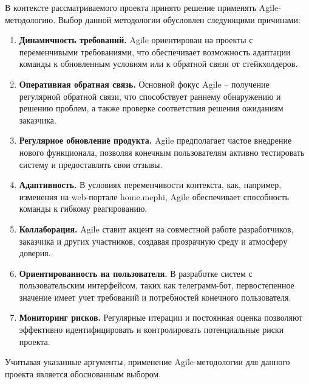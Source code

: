 В контексте рассматриваемого проекта принято решение применять
Agile-методологию. Выбор данной методологии обусловлен следующими причинами:

\begin{enumerate}
    \item \textbf{Динамичность требований.} Agile ориентирован на проекты с
переменчивыми требованиями, что обеспечивает возможность адаптации команды к
обновленным условиям или к обратной связи от стейкхолдеров.
    
    \item \textbf{Оперативная обратная связь.} Основной фокус Agile -- получение
регулярной обратной связи, что способствует раннему обнаружению и решению
проблем, а также проверке соответствия решения ожиданиям заказчика.
    
    \item \textbf{Регулярное обновление продукта.} Agile предполагает частое
внедрение нового функционала, позволяя конечным пользователям активно
тестировать систему и предоставлять свои отзывы.
    
    \item \textbf{Адаптивность.} В условиях переменчивости контекста, как,
например, изменения на web-портале home.mephi, Agile обеспечивает способность
команды к гибкому реагированию.
    
    \item \textbf{Коллаборация.} Agile ставит акцент на совместной работе
разработчиков, заказчика и других участников, создавая прозрачную среду и
атмосферу доверия.
    
    \item \textbf{Ориентированность на пользователя.} В разработке систем с
пользовательским интерфейсом, таких как телеграмм-бот, первостепенное значение
имеет учет требований и потребностей конечного пользователя.
    
    \item \textbf{Мониторинг рисков.} Регулярные итерации и постоянная оценка
позволяют эффективно идентифицировать и контролировать потенциальные риски
проекта.
\end{enumerate}

Учитывая указанные аргументы, применение Agile-методологии для данного проекта
является обоснованным выбором.